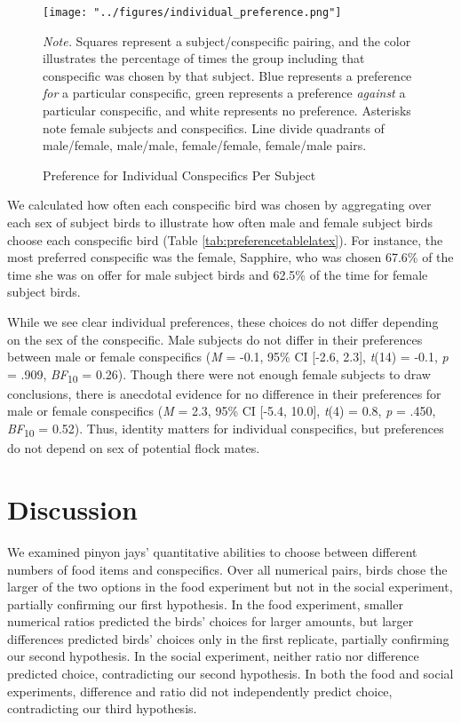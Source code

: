 \documentclass[
  ,pub,floatsintext]{apa6}
\begin{document}
\begin{figure}[h]
\caption{\newline Preference for Individual Conspecifics Per Subject \label{fig:individualpref}}
\begin{center}
\texttt{[image: "../figures/individual\_preference.png"]}
\end{center}

\textit{Note.} Squares represent a subject/conspecific pairing, and the color illustrates the percentage of times the group including that conspecific was chosen by that subject. Blue represents a preference \emph{for} a particular conspecific, green represents a preference \emph{against} a particular conspecific, and white represents no preference. Asterisks note female subjects and conspecifics. Line divide quadrants of male/female, male/male, female/female, female/male pairs.
\end{figure}

We calculated how often each conspecific bird was chosen by aggregating over each sex of subject birds to illustrate how often male and female subject birds choose each conspecific bird (Table \ref{tab:preferencetablelatex}). For instance, the most preferred conspecific was the female, Sapphire, who was chosen 67.6\% of the time she was on offer for male subject birds and 62.5\% of the time for female subject birds.

While we see clear individual preferences, these choices do not differ depending on the sex of the conspecific. Male subjects do not differ in their preferences between male or female conspecifics (\emph{M} = -0.1, 95\% CI {[}-2.6, 2.3{]}, \emph{t}(14) = -0.1, \emph{p} = .909, \emph{BF}\textsubscript{10} = 0.26). Though there were not enough female subjects to draw conclusions, there is anecdotal evidence for no difference in their preferences for male or female conspecifics (\emph{M} = 2.3, 95\% CI {[}-5.4, 10.0{]}, \emph{t}(4) = 0.8, \emph{p} = .450, \emph{BF}\textsubscript{10} = 0.52). Thus, identity matters for individual conspecifics, but preferences do not depend on sex of potential flock mates.

\clearpage

\hypertarget{discussion}{%
\section{Discussion}\label{discussion}}

We examined pinyon jays' quantitative abilities to choose between different numbers of food items and conspecifics. Over all numerical pairs, birds chose the larger of the two options in the food experiment but not in the social experiment, partially confirming our first hypothesis. In the food experiment, smaller numerical ratios predicted the birds' choices for larger amounts, but larger differences predicted birds' choices only in the first replicate, partially confirming our second hypothesis. In the social experiment, neither ratio nor difference predicted choice, contradicting our second hypothesis. In both the food and social experiments, difference and ratio did not independently predict choice, contradicting our third hypothesis.
\end{document}
